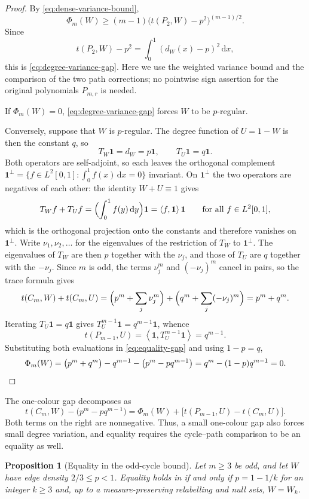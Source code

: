 \documentclass[11pt]{article}
\newtheorem{proposition}[theorem]{Proposition}
\numberwithin{equation}{section}
\newcommand{\one}{\mathbf 1}
\newcommand{\ip}[2]{\left\langle #1,#2\right\rangle}
\newcommand{\dd}{\,\mathrm d}
\newcommand{\tC}[2]{t(C_{#1},#2)}
\newcommand{\tP}[2]{t(P_{#1},#2)}
\newcommand{\Tker}[1]{T_{#1}}
\newcommand{\dW}{d_W}
\begin{document}
\begin{proof}
  By \eqref{eq:dense-variance-bound},
  \[
    \Phi_m(W)\ge(m-1)\bigl(\tP2W-p^2\bigr)^{(m-1)/2}.
  \]
  Since
  \[
    \tP2W-p^2=\int_0^1(\dW(x)-p)^2\dd x,
  \]
  this is \eqref{eq:degree-variance-gap}. Here we use the weighted
  variance bound and the comparison of the two path corrections;
  no pointwise sign assertion for the original polynomials
  $P_{m,r}$ is needed.

  If $\Phi_m(W)=0$, \eqref{eq:degree-variance-gap} forces $W$ to be $p$-regular.

  Conversely, suppose that $W$ is $p$-regular.
  The degree function of $U=1-W$ is then the constant $q$, so
  \[
    \Tker W\one=\dW=p\one,
    \qquad
    \Tker U\one=q\one .
  \]
  Both operators are self-adjoint, so each leaves the orthogonal complement
  $\one^\perp=\{f\in L^2[0,1]:\int_0^1f(x)\dd x=0\}$ invariant.
  On $\one^\perp$ the two operators are negatives of each other: the identity
  $W+U\equiv1$ gives
  \[
    \Tker Wf+\Tker Uf=\Bigl(\int_0^1f(y)\dd y\Bigr)\one=\ip f\one\one
    \qquad\text{for all }f\in L^2[0,1],
  \]
  which is the orthogonal projection onto the constants and therefore vanishes on
  $\one^\perp$.
  Write $\nu_1,\nu_2,\ldots$ for the eigenvalues of the restriction of $\Tker W$ to
  $\one^\perp$.
  The eigenvalues of $\Tker W$ are then $p$ together with the $\nu_j$, and those of
  $\Tker U$ are $q$ together with the $-\nu_j$.
  Since $m$ is odd, the terms $\nu_j^m$ and $(-\nu_j)^m$ cancel in pairs, so the
  trace formula gives
  \[
    \tC mW+\tC mU
    =\Bigl(p^m+\sum_j\nu_j^m\Bigr)+\Bigl(q^m+\sum_j(-\nu_j)^m\Bigr)
    =p^m+q^m.
  \]
  Iterating $\Tker U\one=q\one$ gives $\Tker U^{m-1}\one=q^{m-1}\one$, whence
  \[
    \tP{m-1}U=\ip\one{\Tker U^{m-1}\one}=q^{m-1}.
  \]
  Substituting both evaluations in \eqref{eq:equality-gap} and using $1-p=q$,
  \[
    \Phi_m(W)
    =\bigl(p^m+q^m\bigr)-q^{m-1}-\bigl(p^m-pq^{m-1}\bigr)
    =q^m-(1-p)q^{m-1}
    =0. \qedhere
  \]
\end{proof}

The one-colour gap decomposes as
\begin{equation}\label{eq:one-colour-gap}
  \tC mW-\bigl(p^m-pq^{m-1}\bigr)
  =\Phi_m(W)+\bigl[\tP{m-1}U-\tC mU\bigr].
\end{equation}
Both terms on the right are nonnegative.
Thus, a small one-colour gap also forces small degree variation, and equality requires the cycle--path comparison to be an equality as well.

\begin{proposition}[Equality in the odd-cycle bound]
\label{prop:main-equality}
  Let $m\ge3$ be odd, and let $W$ have edge density $2/3\le p<1$.
  Equality holds in  if and only if $p=1-1/k$ for an integer $k\ge3$ and, up to a measure-preserving relabelling and null sets, $W=W_k$.
\end{proposition}
\end{document}
